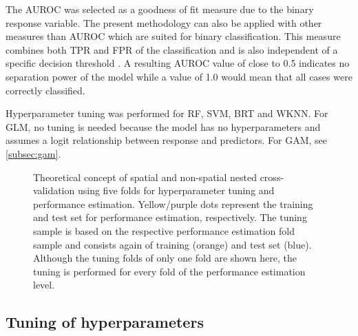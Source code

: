 \documentclass[review]{elsarticle}
\begin{document}
The \ac{AUROC} was selected as a goodness of fit measure due to the binary response variable.
The present methodology can also be applied with other measures than AUROC which are suited for binary classification.
This measure combines both \ac{TPR} and \ac{FPR} of the classification and is also independent of a specific decision threshold \citep{Candy2013}.
A resulting \ac{AUROC} value of close to 0.5 indicates no separation power of the model while a value of 1.0 would mean that all cases were correctly classified.

Hyperparameter tuning was performed for \ac{RF}, \ac{SVM}, \ac{BRT} and \ac{WKNN}.
For \ac{GLM}, no tuning is needed because the model has no hyperparameters and assumes a logit relationship between response and predictors.
For \ac{GAM}, see \autoref{subsec:gam}.

\begin{figure} [t!]
	\begin{center}
		\caption[]{Theoretical concept of spatial and non-spatial nested cross-validation using five folds for hyperparameter tuning and performance estimation.
			Yellow/purple dots represent the training and test set for performance estimation, respectively.
			The tuning sample is based on the respective performance estimation fold sample and consists again of training (orange) and test set (blue).
			Although the tuning folds of only one fold are shown here, the tuning is performed for every fold of the performance estimation level.}
		\label{fig:nested_cv}
	\end{center}
\end{figure}

\subsection{Tuning of hyperparameters}
\label{subsec:methods_tuning}
\end{document}
